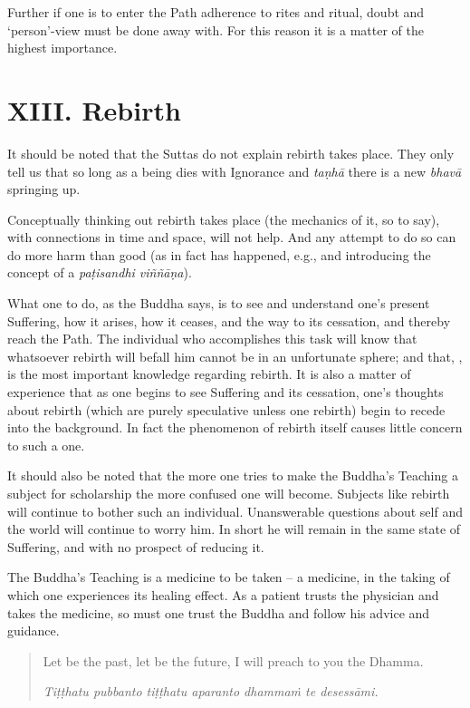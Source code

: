 Further if one is to enter the Path adherence to rites and ritual, doubt and `person'-view must be done away with. For this reason it is a matter of the highest importance.

\section{XIII. Rebirth}

It should be noted that the Suttas do not explain  rebirth takes place. They only tell us that so long as a being dies with Ignorance and \emph{taṇhā} there is a new \emph{bhavā} springing up.

Conceptually thinking out  rebirth takes place (the mechanics of it, so to say), with connections in time and space, will not help. And any attempt to do so can do more harm than good (as in fact has happened, e.g.,  and introducing the concept of a \emph{paṭisandhi viññāṇa}).

What one  to do, as the Buddha says, is to see and understand one's present Suffering, how it arises, how it ceases, and the way to its cessation, and thereby reach the Path. The individual who accomplishes this task will know that whatsoever rebirth will befall him cannot be in an unfortunate sphere; and that, , is the most important knowledge regarding rebirth. It is also a matter of experience that as one begins to see Suffering and its cessation, one's thoughts about rebirth (which are purely speculative unless one  rebirth) begin to recede into the background. In fact the phenomenon of rebirth itself causes little concern to such a one.

It should also be noted that the more one tries to make the Buddha's Teaching a subject for scholarship the more confused one will become. Subjects like rebirth will continue to bother such an individual. Unanswerable questions about self and the world will continue to worry him. In short he will remain in the same state of Suffering, and with no prospect of reducing it.

The Buddha's Teaching is a medicine to be taken -- a medicine, in the taking of which one experiences its healing effect. As a patient trusts the physician and takes the medicine, so must one trust the Buddha and follow his advice and guidance.

\begin{quote}
Let be the past, let be the future, I will preach to you the Dhamma.

\emph{Tiṭṭhatu pubbanto tiṭṭhatu aparanto dhammaṁ te desessāmi.}
\end{quote}

